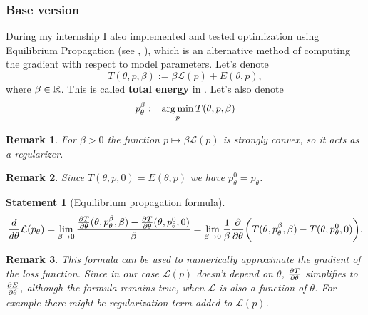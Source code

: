 \documentclass[a4paper,10.5pt]{report}
\newtheorem{statement}{Statement}
\newtheorem{remark}{Remark}
\begin{document}
\subsubsection{Base version}
During my internship I also implemented and tested optimization using Equilibrium Propagation (see \cite{eqprop}, \cite{zucchet2022beyond}), which is an alternative method of computing the gradient with respect to model parameters.
Let's denote
\begin{equation}
T(\theta, p, \beta) := \beta \mathcal{L}(p) + E(\theta, p),
\end{equation}
where $\beta \in \mathbb{R}$.
 This is called \textbf{total energy} in \cite{eqprop}. Let's also denote
\begin{equation}
p_{\theta}^{\beta}:=\operatorname*{arg\,min}_p T(\theta, p, \beta)
\end{equation}
\begin{remark}
 For $\beta>0$ the function $p \mapsto \beta \mathcal{L}(p)$ is strongly convex, so it acts as a regularizer.
 \end{remark}
 \begin{remark}
   Since $T(\theta,p,0) = E(\theta,p)$ we have $p_{\theta}^{0}=p_{\theta}$.
 \end{remark}


\begin{statement}[Equilibrium propagation formula]
 \begin{equation}
 \frac{d}{d\theta} \mathcal{L}(p_\theta) = \lim_{\beta \to 0} \frac{\frac{\partial T}{\partial \theta}(\theta, p_\theta^\beta, \beta)-\frac{\partial T}{\partial \theta}(\theta, p_\theta^0, 0) }{\beta} = \lim_{\beta \to 0}\frac{1}{\beta} \frac{\partial }{\partial \theta} \bigg(T(\theta, p_\theta^\beta,\beta) - T(\theta, p_\theta^0, 0)\bigg).
\end{equation}
\end{statement}
\begin{remark}

This formula can be used to numerically approximate the gradient of the loss function.
Since in our case $\mathcal{L}(p)$ doesn't depend on $\theta$, $\frac{\partial T}{\partial \theta}$ simplifies to $\frac{\partial E}{\partial \theta}$, although the formula remains true, when $\mathcal{L}$ is also a function of $\theta$. For example there might be regularization term added to $\mathcal{L}(p)$.
\end{remark}
\end{document}
